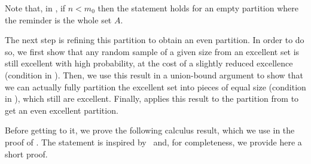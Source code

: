 
        Note that, in ,
        if $n < m_0$ then the statement holds for an empty partition where the reminder is the whole set $A$.

        The next step is refining this partition to obtain an even partition.
        In order to do so, we first show that any random sample of a given size from an excellent set is still excellent
        with high probability, at the cost of a slightly reduced excellence (condition
         in
        ).
        Then, we use this result in a union-bound argument to show that we can actually fully partition the excellent set into
        pieces of equal size (condition  in
        ), which still are excellent.
        Finally,  applies this result to the partition from
         to get an even excellent partition.

        Before getting to it, we prove the following calculus result, which we use in the proof of .
        The statement is inspired by~\cite[page 272]{on_the_uniform_convergence_of_relative_frequencies_of_events_to_their_probabilities}
        and, for completeness, we provide here a short proof.


